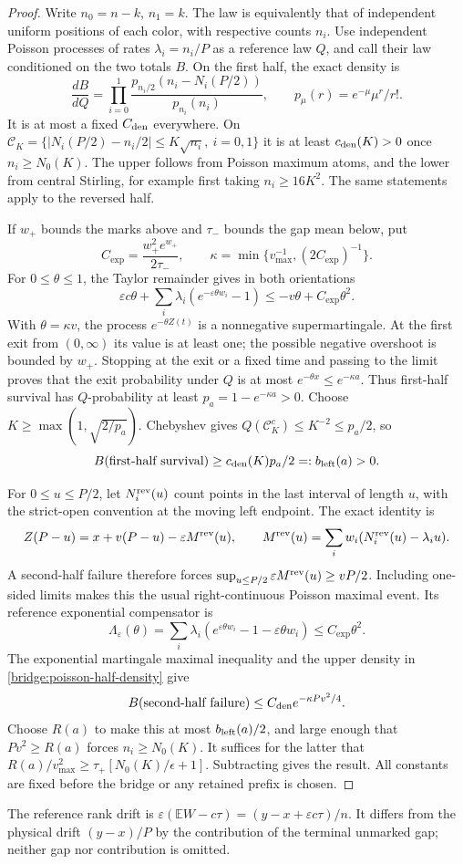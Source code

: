 \begin{proof}
Write $n_0=n-k$, $n_1=k$. The law is equivalently that of independent
uniform positions of each color, with respective counts $n_i$. Use
independent Poisson processes of rates $\lambda_i=n_i/P$ as a reference
law $Q$, and call their law conditioned on the two totals $B$. On the
first half, the exact density is
\begin{equation}
 \frac{dB}{dQ}
 =\prod_{i=0}^1
 \frac{p_{n_i/2}(n_i-N_i(P/2))}{p_{n_i}(n_i)},
 \qquad p_\mu(r)=e^{-\mu}\mu^r/r!.
 \label{bridge:poisson-half-density}
\end{equation}
It is at most a fixed $C_{\rm den}$ everywhere. On
$\mathcal C_K=\{|N_i(P/2)-n_i/2|\le K\sqrt{n_i},\ i=0,1\}$
it is at least $c_{\rm den}(K)>0$ once $n_i\ge N_0(K)$.
The upper follows from Poisson maximum atoms, and the lower from
central Stirling, for example first taking $n_i\ge16K^2$. The same
statements apply to the reversed half.

If $w_+$ bounds the marks above and $\tau_-$ bounds the gap mean
below, put
\[
 C_{\exp}=\frac{w_+^2e^{w_+}}{2\tau_-},\qquad
 \kappa=\min\{v_{\max}^{-1},(2C_{\exp})^{-1}\}.
\]
For $0\le\theta\le1$, the Taylor remainder gives in both orientations
\[
 \varepsilon c\theta+
 \sum_i\lambda_i(e^{-\varepsilon\theta w_i}-1)
 \le-v\theta+C_{\exp}\theta^2.
\]
With $\theta=\kappa v$, the process $e^{-\theta Z(t)}$ is a
nonnegative supermartingale. At the first exit from $(0,\infty)$
its value is at least one; the possible negative overshoot is bounded
by $w_+$. Stopping at the exit or a fixed time and passing to the
limit proves that the exit probability under $Q$ is at most
$e^{-\theta x}\le e^{-\kappa a}$. Thus first-half survival has
$Q$-probability at least $p_a=1-e^{-\kappa a}>0$.
Choose $K\ge\max(1,\sqrt{2/p_a})$. Chebyshev gives
$Q(\mathcal C_K^c)\le K^{-2}\le p_a/2$, so
\[
 B(\text{first-half survival})
 \ge c_{\rm den}(K)p_a/2=:b_{\rm left}(a)>0.
\]

For $0\le u\le P/2$, let $N_i^{\rm rev}(u)$ count points in the
last interval of length $u$, with the strict-open convention at the
moving left endpoint. The exact identity is
\[
 Z(P-u)=x+v(P-u)-\varepsilon M^{\rm rev}(u),\qquad
 M^{\rm rev}(u)=\sum_iw_i(N_i^{\rm rev}(u)-\lambda_i u).
\]
A second-half failure therefore forces
$\sup_{u\le P/2}\varepsilon M^{\rm rev}(u)\ge vP/2$.
Including one-sided limits makes this the usual right-continuous
Poisson maximal event. Its reference exponential compensator is
\[
 \Lambda_\varepsilon(\theta)
 =\sum_i\lambda_i(e^{\varepsilon\theta w_i}-1
                           -\varepsilon\theta w_i)
 \le C_{\exp}\theta^2.
\]
The exponential martingale maximal inequality and the upper density
in \eqref{bridge:poisson-half-density} give
\[
 B(\text{second-half failure})
 \le C_{\rm den}e^{-\kappa Pv^2/4}.
\]
Choose $R(a)$ to make this at most $b_{\rm left}(a)/2$, and large
enough that $Pv^2\ge R(a)$ forces $n_i\ge N_0(K)$. It suffices for
the latter that
$R(a)/v_{\max}^2\ge\tau_+[N_0(K)/\epsilon+1]$.
Subtracting gives the result. All constants are fixed before the
bridge or any retained prefix is chosen.
\end{proof}

The reference rank drift is
$\varepsilon(\mathbb EW-c\tau)=(y-x+\varepsilon c\tau)/n$.
It differs from the physical drift $(y-x)/P$ by the contribution of
the terminal unmarked gap; neither gap nor contribution is omitted.
